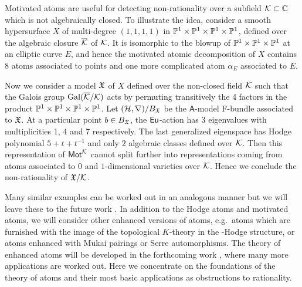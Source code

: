 \documentclass[twoside,leqno]{article}
\numberwithin{equation}{section}
\theoremstyle{plain}
\theoremstyle{definition}
\begin{document}
Motivated atoms are useful for detecting non-rationality over a subfield $\mathcal K\subset \mathbb C$ which is not algebraically closed.
To illustrate the idea, consider a smooth hypersurface $X$ of multi-degree $(1, 1, 1, 1)$ in 
$\mathbb P^1 \times \mathbb P^1 \times \mathbb P^1 \times \mathbb P^1$, defined over the algebraic closure $\overline{\mathcal K}$ of $\mathcal K$. It is isomorphic to the blowup of $\mathbb P^1 \times \mathbb P^1 \times \mathbb P^1$ at an elliptic curve $E$, and hence the motivated atomic decomposition of $X$ contains 8 atoms associated to points and one more complicated atom $\alpha_E$ associated to $E$.

Now we consider a model $\mathfrak X$ of $X$ defined over the non-closed field $\mathcal K$ such that the Galois group $\operatorname{Gal}(\overline{\mathcal K}/\mathcal K)$ acts by permuting transitively the 4 factors in the product $\mathbb P^1 \times \mathbb P^1 \times \mathbb P^1 \times \mathbb P^1$.
Let $(\mathcal H,\nabla)/B_{\mathfrak X}$ be the $\mathsf{A}$-model F-bundle associated to $\mathfrak X$. At a particular point $b\in B_{\mathfrak X}$, the $\operatorname{\mathsf{Eu}}$-action has 3 eigenvalues with multiplicities 1, 4 and 7 respectively.
The last generalized eigenspace has Hodge polynomial $5 + t + t^{-1}$ and only $2$ algebraic classes defined over $\mathcal K$.
Then this representation of $\mathsf{Mot}^{\mathcal K}$ cannot split further into representations coming from atoms associated to $0$ and $1$-dimensional varieties over $\mathcal K$.
Hence we conclude the non-rationality of $\mathfrak X/\mathcal K$.

Many similar examples can be worked out in an analogous manner but we will leave these to the future work \cite{CGKK}.
In addition to the Hodge atoms and motivated atoms, we will consider other enhanced 
versions of atoms, e.g.\ atoms which are furnished with the image of the topological $K$-theory in the \nc-Hodge structure, or atoms enhanced with Mukai pairings or Serre automorphisms.
The theory of enhanced atoms will be developed in the forthcoming work \cite{KKPY-Gamma}, where many more applications are worked out.
Here we concentrate on the foundations of the theory of atoms and their most basic applications as obstructions to rationality.

\medskip
\end{document}
